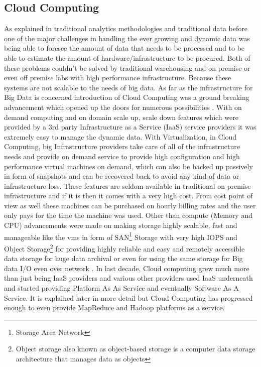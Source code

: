 \documentclass[sigconf]{acmart}
\begin{document}
\subsection{Cloud Computing}
As explained in traditional analytics methodologies and traditional data before one of the major challenges in handling the ever growing and dynamic data was being able to foresee the amount of data that needs to be processed and to be able to estimate the amount of hardware/infrastructure to be procured. Both of these problems couldn't be solved by traditional warehousing and on premise or even off premise labs with high performance infrastructure. Because these systems are not scalable to the needs of big data. As far as the infrastructure for Big Data is concerned introduction of Cloud Computing was a ground breaking advancement which opened up the doors for numerous possibilities  \cite{krishnan}. With on demand computing and on domain scale up, scale down features which were provided by a 3rd party Infrastructure as a Service (IaaS) service providers it was extremely easy to manage the dynamic data. With Virtualization, in Cloud Computing, big Infrastructure providers take care of all of the infrastructure needs and provide on demand service to provide high configuration and high performance virtual machines on demand, which can also be backed up passively in form of snapshots and can be recovered back to avoid any kind of data or infrastructure loss. These features are seldom available in traditional on premise infrastructure and if it is then it comes with a very high cost. From cost point of view as well these machines can be purchased on hourly billing rates and the user only pays for the time the machine was used. Other than compute (Memory and CPU) advancements were made on making storage highly scalable, fast and manageable like the vms in form of SAN\footnote{Storage Area Network} Storage with very high IOPS and Object Storage\footnote{Object storage also known as object-based storage is a computer data storage architecture that manages data as objects} for providing highly reliable and easy and remotely accessible data storage for huge data archival or even for using the same storage for Big data I/O even over network \cite{intelstorage}. In last decade, Cloud computing grew much more than just being IaaS providers and various other providers used IaaS underneath and started providing Platform As As Service and eventually Software As A Service. It is explained later in more detail but Cloud Computing has progressed enough to even provide MapReduce and Hadoop platforms as a service.
\end{document}
